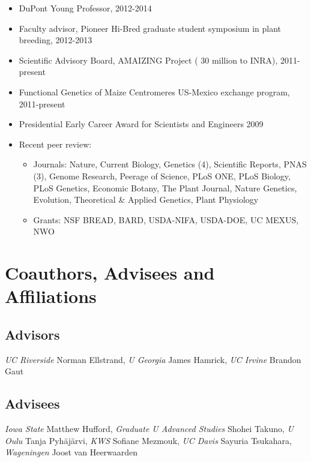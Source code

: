\documentclass[11pt]{article}
\newcommand\e[1]{\emph{#1}}
\begin{document}
\begin{itemize} \setlength{\itemsep}{0pt} \setlength{\parskip}{2pt} \setlength{\parsep}{0pt}

\item DuPont Young Professor, 2012-2014

\item Faculty advisor, Pioneer Hi-Bred graduate student symposium in plant breeding, 2012-2013

\item Scientific Advisory Board, AMAIZING Project ( 30 million to INRA), 2011-present 

\item Functional Genetics of Maize Centromeres US-Mexico exchange program, 2011-present

\item Presidential Early Career Award for Scientists and Engineers 2009

\item Recent peer review: 
\begin{itemize} 
\item Journals: Nature, Current Biology, Genetics (4), Scientific Reports, PNAS (3), Genome Research, Peerage of Science, PLoS ONE, PLoS Biology, PLoS Genetics, Economic Botany, The Plant Journal, Nature Genetics, Evolution, Theoretical \& Applied Genetics, Plant Physiology%

\item Grants: NSF BREAD, BARD, USDA-NIFA, USDA-DOE, UC MEXUS, NWO
\end{itemize}
\end{itemize}

\section{Coauthors, Advisees and Affiliations}

\subsection{Advisors}

\emph{UC Riverside} Norman Ellstrand, \e{U Georgia} James Hamrick, \emph{UC Irvine} Brandon Gaut
 
\subsection{Advisees}

\e{Iowa State} Matthew Hufford, \e{Graduate U Advanced Studies} Shohei Takuno, \e{U Oulu} Tanja Pyh\"aj\"arvi, \e{KWS} Sofiane Mezmouk, \e{UC Davis} Sayuria Tsukahara, \e{Wageningen} Joost van Heerwaarden
\end{document}
